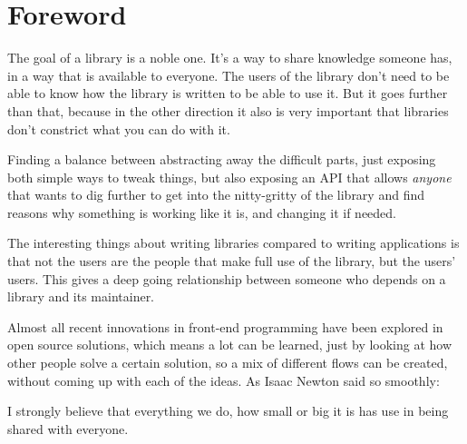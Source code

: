 
\chapter{Foreword}%
\label{chp:foreword}

The goal of a library is a noble one. It's a way to share knowledge someone has, in a way that is available to everyone. The users of the library don't need to be able to know how the library is written to be able to use it. But it goes further than that, because in the other direction it also is very important that libraries don't constrict what you can do with it.

Finding a balance between abstracting away the difficult parts, just exposing both simple ways to tweak things, but also exposing an API that allows \emph{anyone} that wants to dig further to get into the nitty-gritty of the library and find reasons why something is working like it is, and changing it if needed.

The interesting things about writing libraries compared to writing applications is that not the users are the people that make full use of the library, but the users' users. This gives a deep going relationship between someone who depends on a library and its maintainer.

Almost all recent innovations in front-end programming have been explored in open source solutions, which means a lot can be learned, just by looking at how other people solve a certain solution, so a mix of different flows can be created, without coming up with each of the ideas. As Isaac Newton said so smoothly:


I strongly believe that everything we do, how small or big it is has use in being shared with everyone. 

